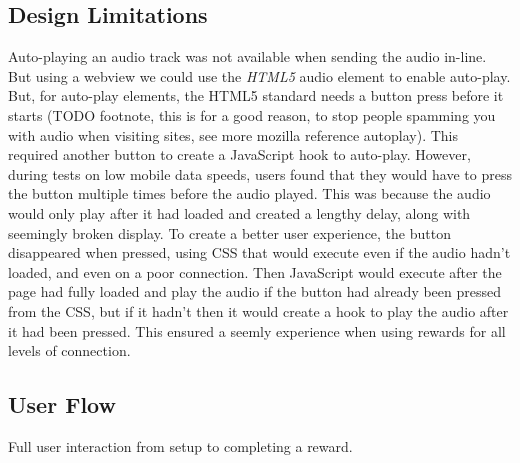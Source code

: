 \subsection{Design Limitations}

Auto-playing an audio track was not available when sending the audio in-line. But using a webview we could use the \textit{HTML5} audio element to enable auto-play.
But, for auto-play elements, the HTML5 standard needs a button press before it starts (TODO footnote, this is for a good reason, to stop people spamming you with audio when visiting sites, see more mozilla reference autoplay).
This required another button to create a JavaScript hook to auto-play.
However, during tests on low mobile data speeds, users found that they would have to press the button multiple times before the audio played.
This was because the audio would only play after it had loaded and created a lengthy delay, along with seemingly broken display.
To create a better user experience, the button disappeared when pressed, using CSS that would execute even if the audio hadn't loaded, and even on a poor connection.
Then JavaScript would execute after the page had fully loaded and play the audio if the button had already been pressed from the CSS, but if it hadn't then it would create a hook to play the audio after it had been pressed.
This ensured a seemly experience when using rewards for all levels of connection.

\subsection{User Flow}

Full user interaction from setup to completing a reward.

